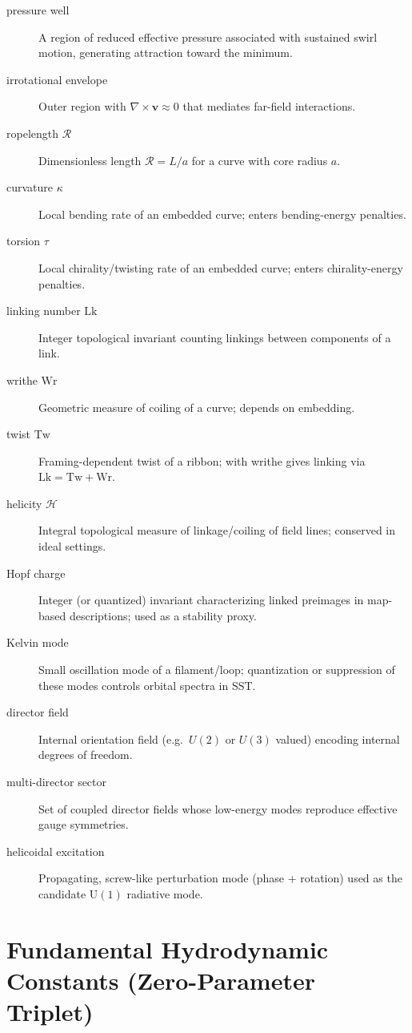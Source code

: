 \documentclass[10pt]{article}
\begin{document}
\begin{description}
\item[pressure well] A region of reduced effective pressure associated with sustained swirl motion, generating attraction toward the minimum.
\item[irrotational envelope] Outer region with $\nabla\times\mathbf{v}\approx 0$ that mediates far-field interactions.
\item[ropelength $\mathcal{R}$] Dimensionless length $\mathcal{R}=L/a$ for a curve with core radius $a$.
\item[curvature $\kappa$] Local bending rate of an embedded curve; enters bending-energy penalties.
\item[torsion $\tau$] Local chirality/twisting rate of an embedded curve; enters chirality-energy penalties.
\item[linking number $\mathrm{Lk}$] Integer topological invariant counting linkings between components of a link.
\item[writhe $\mathrm{Wr}$] Geometric measure of coiling of a curve; depends on embedding.
\item[twist $\mathrm{Tw}$] Framing-dependent twist of a ribbon; with writhe gives linking via $\mathrm{Lk}=\mathrm{Tw}+\mathrm{Wr}$.
\item[helicity $\mathcal{H}$] Integral topological measure of linkage/coiling of field lines; conserved in ideal settings.
\item[Hopf charge] Integer (or quantized) invariant characterizing linked preimages in map-based descriptions; used as a stability proxy.
\item[Kelvin mode] Small oscillation mode of a filament/loop; quantization or suppression of these modes controls orbital spectra in SST.
\item[director field] Internal orientation field (e.g.\ $U(2)$ or $U(3)$ valued) encoding internal degrees of freedom.
\item[multi-director sector] Set of coupled director fields whose low-energy modes reproduce effective gauge symmetries.
\item[helicoidal excitation] Propagating, screw-like perturbation mode (phase + rotation) used as the candidate $\mathrm{U}(1)$ radiative mode.
\end{description}

\clearpage


    \appendix

    \section{Fundamental Hydrodynamic Constants (Zero-Parameter Triplet)}
    \label{app:constants_triplet}
\end{document}
